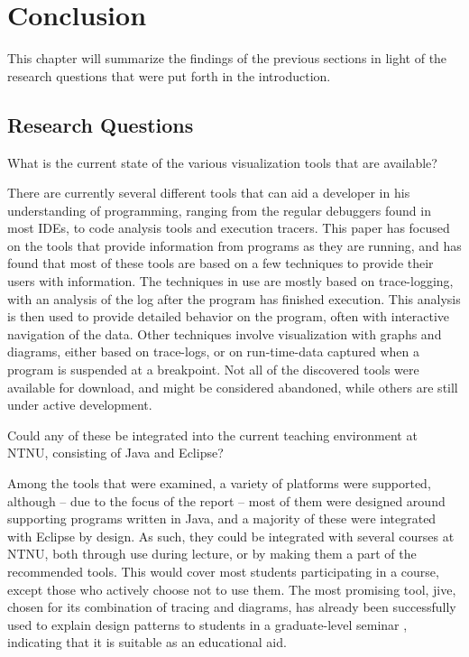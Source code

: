\chapter{Conclusion}\label{conclusion}

This chapter will summarize the findings of the previous sections in light of the research questions that were put forth in the introduction.

\section{Research Questions}\label{conclusionRQs}

\begin{theorem}
What is the current state of the various visualization tools that are available?
\end{theorem}
There are currently several different tools that can aid a developer in his understanding of programming, ranging from the regular debuggers found in most IDEs, to code analysis tools and execution tracers.
This paper has focused on the tools that provide information from programs as they are running, and has found that most of these tools are based on a few techniques to provide their users with information.
The techniques in use are mostly based on trace-logging, with an analysis of the log after the program has finished execution.
This analysis is then used to provide detailed behavior on the program, often with interactive navigation of the data.
Other techniques involve visualization with graphs and diagrams, either based on trace-logs, or on run-time-data captured when a program is suspended at a breakpoint.
Not all of the discovered tools were available for download, and might be considered abandoned, while others are still under active development.

\begin{theorem}
Could any of these be integrated into the current teaching environment at NTNU, consisting of Java and Eclipse?
\end{theorem}
Among the tools that were examined, a variety of platforms were supported, although -- due to the focus of the report -- most of them were designed around supporting programs written in Java, and a majority of these were integrated with Eclipse by design.
As such, they could be integrated with several courses at NTNU, both through use during lecture, or by making them a part of the recommended tools.
This would cover most students participating in a course, except those who actively choose not to use them.
The most promising tool, \gls{jive}, chosen for its combination of tracing and diagrams, has already been successfully used to explain design patterns to students in a graduate-level seminar \cite[p. 99]{Gestwicki2005}, indicating that it is suitable as an educational aid.

